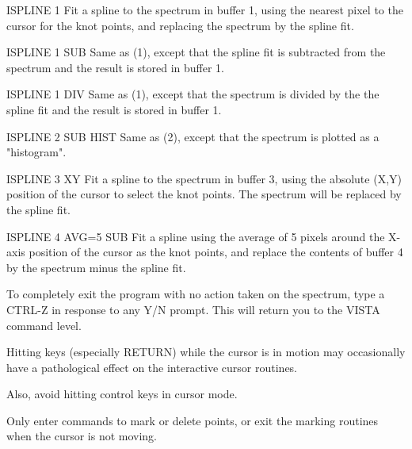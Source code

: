\begin{example} 
  \item[ISPLINE 1 \hfill]{Fit a spline to the spectrum in buffer 1, using
       the nearest pixel to the cursor for the knot points, and replacing
       the spectrum by the spline fit.}

  \item[ISPLINE 1 SUB\hfill]{Same as (1), except that the spline fit is
       subtracted from the spectrum and the result is stored in buffer 1.}

  \item[ISPLINE 1 DIV \hfill]{Same as (1), except that the spectrum is
       divided by the the spline fit and the result is stored in buffer 1.}

  \item[ISPLINE 2 SUB HIST\hfill]{Same as (2), except that the spectrum is
       plotted as a "histogram".}

  \item[ISPLINE 3 XY\hfill]{Fit a spline to the spectrum in buffer 3, using
       the absolute (X,Y) position of the cursor to select the knot points.
       The spectrum will be replaced by the spline fit.}

  \item[ISPLINE 4 AVG=5 SUB\hfill]{Fit a spline using the average of 5
       pixels around the X-axis position of the cursor as the knot points,
       and replace the contents of buffer 4 by the spectrum minus the
       spline fit.}
\end{example} 


To completely exit the program with no action taken on the spectrum, type a
CTRL-Z in response to any Y/N prompt.  This will return you to the VISTA
command level.
 
 
Hitting keys (especially RETURN) while the cursor is in motion may
occasionally have a pathological effect on the interactive cursor routines.
 
Also, avoid hitting control keys in cursor mode.
 
Only enter commands to mark or delete points, or exit the marking routines
when the cursor is not moving.

